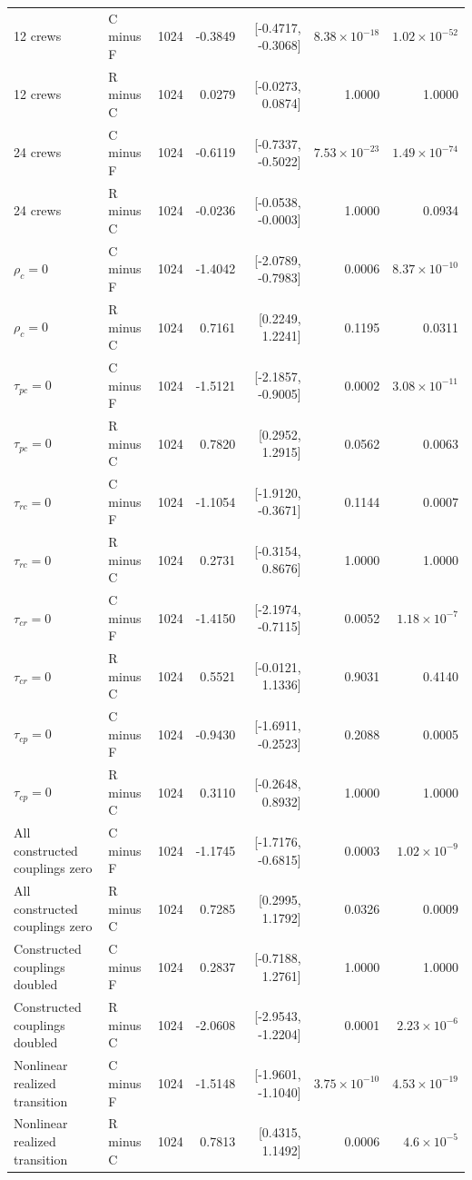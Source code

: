 \begin{table}[t]
{\begin{tabular}{@{}llrrrrr@{}}
12 crews & C minus F & 1024 & -0.3849 & [-0.4717, -0.3068] & $8.38\times10^{-18}$ & $1.02\times10^{-52}$ \\
12 crews & R minus C & 1024 & 0.0279 & [-0.0273, 0.0874] & 1.0000 & 1.0000 \\
24 crews & C minus F & 1024 & -0.6119 & [-0.7337, -0.5022] & $7.53\times10^{-23}$ & $1.49\times10^{-74}$ \\
24 crews & R minus C & 1024 & -0.0236 & [-0.0538, -0.0003] & 1.0000 & 0.0934 \\
$\rho_c=0$ & C minus F & 1024 & -1.4042 & [-2.0789, -0.7983] & 0.0006 & $8.37\times10^{-10}$ \\
$\rho_c=0$ & R minus C & 1024 & 0.7161 & [0.2249, 1.2241] & 0.1195 & 0.0311 \\
$\tau_{pc}=0$ & C minus F & 1024 & -1.5121 & [-2.1857, -0.9005] & 0.0002 & $3.08\times10^{-11}$ \\
$\tau_{pc}=0$ & R minus C & 1024 & 0.7820 & [0.2952, 1.2915] & 0.0562 & 0.0063 \\
$\tau_{rc}=0$ & C minus F & 1024 & -1.1054 & [-1.9120, -0.3671] & 0.1144 & 0.0007 \\
$\tau_{rc}=0$ & R minus C & 1024 & 0.2731 & [-0.3154, 0.8676] & 1.0000 & 1.0000 \\
$\tau_{cr}=0$ & C minus F & 1024 & -1.4150 & [-2.1974, -0.7115] & 0.0052 & $1.18\times10^{-7}$ \\
$\tau_{cr}=0$ & R minus C & 1024 & 0.5521 & [-0.0121, 1.1336] & 0.9031 & 0.4140 \\
$\tau_{cp}=0$ & C minus F & 1024 & -0.9430 & [-1.6911, -0.2523] & 0.2088 & 0.0005 \\
$\tau_{cp}=0$ & R minus C & 1024 & 0.3110 & [-0.2648, 0.8932] & 1.0000 & 1.0000 \\
All constructed couplings zero & C minus F & 1024 & -1.1745 & [-1.7176, -0.6815] & 0.0003 & $1.02\times10^{-9}$ \\
All constructed couplings zero & R minus C & 1024 & 0.7285 & [0.2995, 1.1792] & 0.0326 & 0.0009 \\
Constructed couplings doubled & C minus F & 1024 & 0.2837 & [-0.7188, 1.2761] & 1.0000 & 1.0000 \\
Constructed couplings doubled & R minus C & 1024 & -2.0608 & [-2.9543, -1.2204] & 0.0001 & $2.23\times10^{-6}$ \\
Nonlinear realized transition & C minus F & 1024 & -1.5148 & [-1.9601, -1.1040] & $3.75\times10^{-10}$ & $4.53\times10^{-19}$ \\
Nonlinear realized transition & R minus C & 1024 & 0.7813 & [0.4315, 1.1492] & 0.0006 & $4.6\times10^{-5}$ \\

\end{tabular}}
\end{table}

